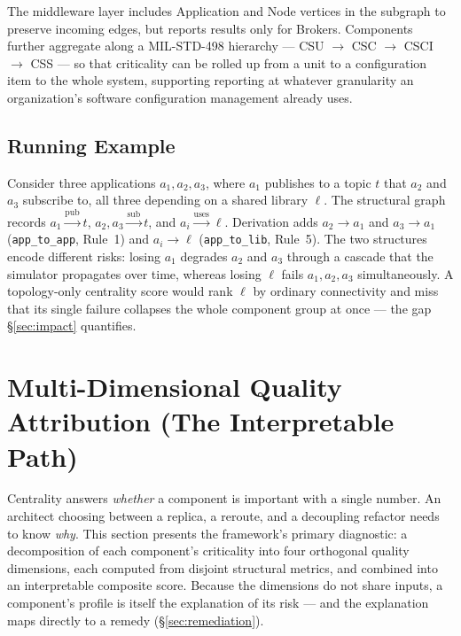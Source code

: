 \documentclass[review]{elsarticle}
\begin{document}
The middleware layer includes Application and Node vertices in the subgraph to preserve incoming
edges, but reports results only for Brokers. Components further aggregate along a MIL-STD-498
hierarchy --- CSU $\to$ CSC $\to$ CSCI $\to$ CSS --- so that criticality can be rolled up from a unit
to a configuration item to the whole system, supporting reporting at whatever granularity an
organization's software configuration management already uses.

\subsection{Running Example}
\label{sec:runningexample}

Consider three applications $a_1, a_2, a_3$, where $a_1$ publishes to a topic $t$ that $a_2$ and
$a_3$ subscribe to, all three depending on a shared library $\ell$. The structural graph records
$a_1\xrightarrow{\text{pub}}t$, $a_2,a_3\xrightarrow{\text{sub}}t$, and
$a_i\xrightarrow{\text{uses}}\ell$. Derivation adds $a_2\to a_1$ and $a_3\to a_1$ (\texttt{app\_to\_app},
Rule~1) and $a_i\to\ell$ (\texttt{app\_to\_lib}, Rule~5). The two structures encode different risks:
losing $a_1$ degrades $a_2$ and $a_3$ through a cascade that the simulator propagates over time,
whereas losing $\ell$ fails $a_1, a_2, a_3$ simultaneously. A topology-only centrality score would
rank $\ell$ by ordinary connectivity and miss that its single failure collapses the whole component
group at once --- the gap \S\ref{sec:impact} quantifies.


\section{Multi-Dimensional Quality Attribution (The Interpretable Path)}
\label{sec:rmav}

Centrality answers \emph{whether} a component is important with a single number. An architect
choosing between a replica, a reroute, and a decoupling refactor needs to know \emph{why}. This
section presents the framework's primary diagnostic: a decomposition of each component's
criticality into four orthogonal quality dimensions, each computed from disjoint structural metrics,
and combined into an interpretable composite score. Because the dimensions do not share inputs, a
component's profile is itself the explanation of its risk --- and the explanation maps directly to
a remedy (\S\ref{sec:remediation}).
\end{document}

